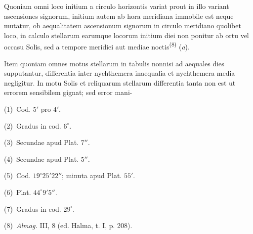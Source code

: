 \documentclass[10pt]{article}
\newcommand{\A}[1]{\hypertarget{#1}{}}
\newcommand{\NM}[1]{\textsuperscript{(#1)}}
\newcommand{\NN}[2]{\par\noindent\textup{(#1)}\ #2}
\begin{document}
\A{AB01-PDF0137-P05}
Quoniam omni loco initium a circulo horizontis variat prout
in illo variant ascensiones signorum, initium autem ab hora
meridiana immobile est neque mutatur, ob aequalitatem
ascensionum signorum in circulo meridiano quolibet loco,
in calculo stellarum earumque locorum initium diei non
ponitur ab ortu vel occasu Solis, sed a tempore meridiei
aut mediae noctis\NM{8} ({\itshape a}).

\A{AB01-PDF0137-P06}
Item quoniam omnes motus stellarum in tabulis nonnisi ad
aequales dies supputantur, differentia inter nychthemera
inaequalia et nychthemera media negligitur. In motu Solis
et reliquarum stellarum differentia tanta non est ut
errorem sensibilem gignat; sed error mani-


\begin{multicols}{2}
\footnotesize

\A{AB01-PDF0137-N01}
\NN{1}{Cod. $5'$ pro $4'$.}

\A{AB01-PDF0137-N02}
\NN{2}{Gradus in cod. $6^\circ$.}

\A{AB01-PDF0137-N03}
\NN{3}{Secundae apud Plat. $7''$.}

\A{AB01-PDF0137-N04}
\NN{4}{Secundae apud Plat. $5''$.}

\A{AB01-PDF0137-N05}
\NN{5}{Cod. $19^\circ25'22''$; minuta apud Plat. $55'$.}

\A{AB01-PDF0137-N06}
\NN{6}{Plat. $44^\circ9'5''$.}

\A{AB01-PDF0137-N07}
\NN{7}{Gradus in cod. $29^\circ$.}

\A{AB01-PDF0137-N08}
\NN{8}{\textit{Almag.} III, 8 (ed. Halma, t. I, p. 208).}

\end{multicols}
\end{document}
